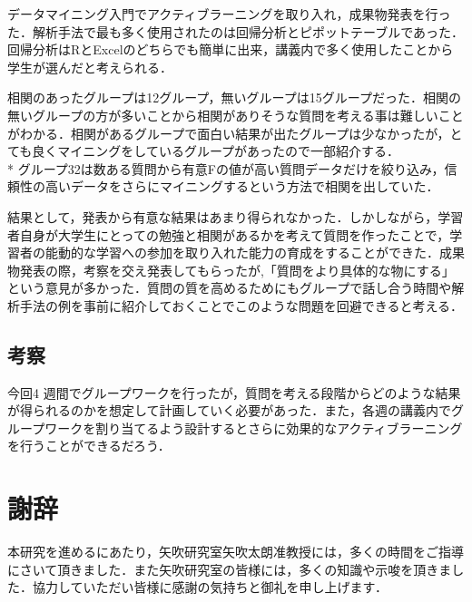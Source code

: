 \newpage

データマイニング入門でアクティブラーニングを取り入れ，成果物発表を行った．解析手法で最も多く使用されたのは回帰分析とピポットテーブルであった．回帰分析はRとExcelのどちらでも簡単に出来，講義内で多く使用したことから学生が選んだと考えられる．

相関のあったグループは12グループ，無いグループは15グループだった．相関の無いグループの方が多いことから相関がありそうな質問を考える事は難しいことがわかる．相関があるグループで面白い結果が出たグループは少なかったが，とても良くマイニングをしているグループがあったので一部紹介する．  \vspace{0.1in} \\*
グループ32は数ある質問から有意Fの値が高い質問データだけを絞り込み，信頼性の高いデータをさらにマイニングするという方法で相関を出していた．

結果として，発表から有意な結果はあまり得られなかった．しかしながら，学習者自身が大学生にとっての勉強と相関があるかを考えて質問を作ったことで，学習者の能動的な学習への参加を取り入れた能力の育成をすることができた．成果物発表の際，考察を交え発表してもらったが,「質問をより具体的な物にする」という意見が多かった．質問の質を高めるためにもグループで話し合う時間や解析手法の例を事前に紹介しておくことでこのような問題を回避できると考える．

\section{考察}
今回4 週間でグループワークを行ったが，質問を考える段階からどのような結果が得られるのかを想定して計画していく必要があった．また，各週の講義内でグループワークを割り当てるよう設計するとさらに効果的なアクティブラーニングを行うことができるだろう．









\chapter*{謝辞}
本研究を進めるにあたり，矢吹研究室矢吹太朗准教授には，多くの時間をご指導にさいて頂きました．また矢吹研究室の皆様には，多くの知識や示唆を頂きました．協力していただい皆様に感謝の気持ちと御礼を申し上げます．




